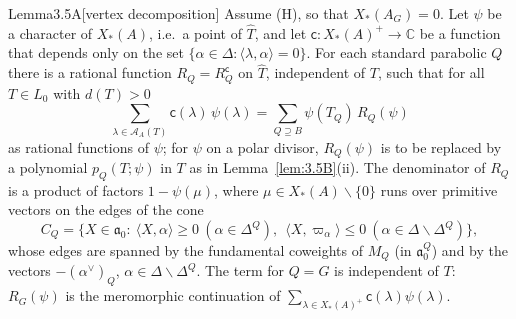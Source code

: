\documentclass[12pt,letterpaper]{article}
\numberwithin{equation}{section}
\theoremstyle{plain}
\theoremstyle{remark}
\theoremstyle{plain}
\theoremstyle{definition}
\theoremstyle{remark}
\theoremstyle{remark}
\newcommand{\cA}{\mathcal{A}}
\newcommand{\fa}{\mathfrak{a}}
\newcommand{\ip}[1]{\langle #1\rangle}
\newcommand{\Th}{\widehat{T}}
\begin{document}
\begin{fixedplain}{Lemma}{3.5A}[vertex decomposition]\label{lem:3.5A}
Assume (H), so that $X_*(A_G)=0$. Let $\psi$ be a character of $X_*(A)$, i.e.\ a point of $\Th$, and let $\mathsf c:X_*(A)^+\to\mathbb{C}$ be a function that depends only on the set $\{\alpha\in\Delta:\ip{\lambda,\alpha}=0\}$. For each standard parabolic $Q$ there is a rational function $R_Q=R_Q^{\mathsf c}$ on $\Th$, independent of $T$, such that for all $T\in L_0$ with $d(T)>0$
\begin{equation}\tag{3.5A}\label{eq:3.5A}
\sum_{\lambda\in\cA_A(T)}\mathsf c(\lambda)\,\psi(\lambda)=\sum_{Q\supseteq B}\psi(T_Q)\,R_Q(\psi)
\end{equation}
as rational functions of $\psi$; for $\psi$ on a polar divisor, $R_Q(\psi)$ is to be replaced by a polynomial $p_Q(T;\psi)$ in $T$ as in Lemma~\ref{lem:3.5B}(ii). The denominator of $R_Q$ is a product of factors $1-\psi(\mu)$, where $\mu\in X_*(A)\smallsetminus\{0\}$ runs over primitive vectors on the edges of the cone
\[
C_Q=\{X\in\fa_0:\ \ip{X,\alpha}\ge0\ (\alpha\in\Delta^Q),\ \ \ip{X,\varpi_\alpha}\le0\ (\alpha\in\Delta\smallsetminus\Delta^Q)\},
\]
whose edges are spanned by the fundamental coweights of $M_Q$ (in $\fa_0^Q$) and by the vectors $-(\alpha^\vee)_Q$, $\alpha\in\Delta\smallsetminus\Delta^Q$. The term for $Q=G$ is independent of $T$: $R_G(\psi)$ is the meromorphic continuation of $\sum_{\lambda\in X_*(A)^+}\mathsf c(\lambda)\psi(\lambda)$.
\end{fixedplain}
\end{document}

